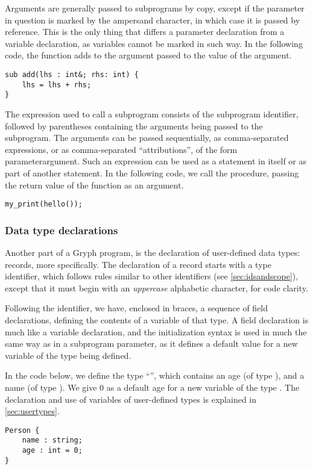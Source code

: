 Arguments are generally passed to subprograms by copy, except if the parameter in question is marked by the ampersand character, in which case it is passed by reference. This is the only thing that differs a parameter declaration from a variable declaration, as variables cannot be marked in such way. In the following code, the function  adds to the argument passed to  the value of the  argument.
\begin{lstlisting}[language=Gryph]
sub add(lhs : int&; rhs: int) {
	lhs = lhs + rhs;
}
\end{lstlisting}

The expression used to call a subprogram consists of the subprogram identifier, followed by parentheses containing the arguments being passed to the subprogram. The arguments can be passed sequentially, as comma-separated expressions, or as comma-separated ``attributions'', of the form parameter\key{=}argument.
Such an expression can be used as a statement in itself or as part of another statement. In the following code, we call the  procedure, passing the return value of the  function as an argument.
\begin{lstlisting}[language=Gryph]
my_print(hello());
\end{lstlisting}

\subsubsection{Data type declarations}
\label{sec:typedecl}
Another part of a Gryph program, is the declaration of user-defined data types: records, more specifically. The declaration of a record starts with a type identifier, which follows rules similar to other identifiers (see \ref{sec:idsandscope}), except that it must begin with an \emph{uppercase} alphabetic character, for code clarity. 

Following the identifier, we have, enclosed in braces, a sequence of field declarations, defining the contents of a variable of that type. A field declaration is much like a variable declaration, and the initialization syntax is used in much the same way as in a subprogram parameter, as it defines a default value for a new variable of the type being defined.

In the code below, we define the type ``'', which contains an age (of type ), and a name (of type ). We give 0 as a default age for a new variable of the type . The declaration and use of variables of user-defined types is explained in \ref{sec:usertypes}.
\begin{lstlisting}[language=Gryph]
Person {
	name : string;
	age : int = 0;
}
\end{lstlisting}


